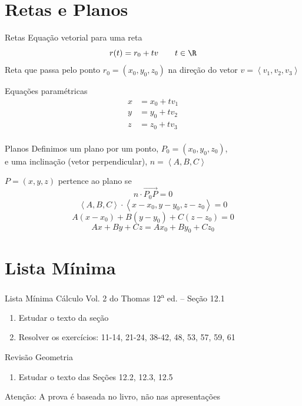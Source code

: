 \section{Retas e Planos}

\begin{frame}{Retas}
  Equação vetorial para uma reta
  \[
    r(t) = r_0 + tv
    \qquad
    t\in\R
  \]
  Reta que passa pelo ponto \(r_0=\left(x_0, y_0, z_0\right)\)
  na direção do vetor \(v=\left<v_1, v_2, v_3\right>\)

  \pause
  \vspace{\baselineskip}
  Equações paramétricas
  \begin{align*}
    x & = x_0 + tv_1 \\
    y & = y_0 + tv_2 \\
    z & = z_0 + tv_3 \\
  \end{align*}
\end{frame}

\begin{frame}{Planos}
  Definimos um plano por um ponto, $P_0=(x_0, y_0, z_0)$, \\
  \pause
  e uma inclinação (vetor perpendicular), $n=\left<A, B, C\right>$

  \pause
  \vspace{\baselineskip}
  $P=(x, y, z)$ pertence ao plano se
  \[
    n\cdot \overrightarrow{P_0P} = 0
  \]
  \pause
  \[
    \left<A, B, C\right>\cdot \left<x-x_0, y-y_0, z-z_0\right> = 0
  \]
  \pause
  \[
    A(x-x_0) + B(y-y_0) + C(z-z_0) = 0
  \]
  \pause
  \[
    Ax + By + Cz = Ax_0 + By_0 + Cz_0
  \]
\end{frame}

\section{Lista Mínima}

\begin{frame}{Lista Mínima}
  Cálculo Vol. 2 do Thomas 12\textsuperscript{a} ed. -- Seção 12.1
  \begin{enumerate}
    \item Estudar o texto da seção
    \item Resolver os exercícios: 11-14, 21-24, 38-42, 48, 53, 57, 59, 61
  \end{enumerate}

  Revisão Geometria
  \begin{enumerate}
    \item Estudar o texto das Seções 12.2, 12.3, 12.5
  \end{enumerate}

  \vfill
  Atenção: A prova é baseada no livro, não nas apresentações
\end{frame}


